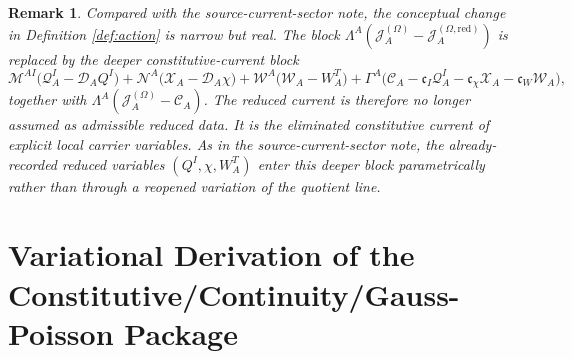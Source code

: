 \documentclass[11pt]{article}
\newcommand{\SpatialD}{\mathcal D}
\newcommand{\SourceCurrent}{\mathcal J^{(\Omega)}}
\newcommand{\SourceCurrentRed}{\mathcal J^{(\Omega,\mathrm{red})}}
\newcommand{\ConstCurrent}{\mathcal C}
\newcommand{\QCarrier}{\mathcal Q}
\newcommand{\ChiCarrier}{\mathcal X}
\newcommand{\TransCarrier}{\mathcal W}
\newcommand{\CurrentMult}{\Lambda}
\newcommand{\ConstGamma}{\Gamma}
\newcommand{\QMult}{\mathscr M}
\newcommand{\ChiMult}{\mathscr N}
\newcommand{\TransMult}{\mathscr W}
\newtheorem{remark}{Remark}
\begin{document}
\begin{remark}
Compared with the source-current-sector note, the conceptual change in Definition \ref{def:action} is narrow but real. The block \(\CurrentMult^A(\SourceCurrent_A-\SourceCurrentRed_A)\) is replaced by the deeper constitutive-current block
\[
\QMult^{AI}\bigl(\QCarrier^I_A-\SpatialD_AQ^I\bigr)
+\ChiMult^A\bigl(\ChiCarrier_A-\SpatialD_A\chi\bigr)
+\TransMult^A\bigl(\TransCarrier_A-W_A^T\bigr)
+\ConstGamma^A\bigl(\ConstCurrent_A-\mathfrak c_I\QCarrier^I_A-\mathfrak c_\chi\ChiCarrier_A-\mathfrak c_W\TransCarrier_A\bigr),
\]
together with \(\CurrentMult^A(\SourceCurrent_A-\ConstCurrent_A)\). The reduced current is therefore no longer assumed as admissible reduced data. It is the eliminated constitutive current of explicit local carrier variables. As in the source-current-sector note, the already-recorded reduced variables \((Q^I,\chi,W_A^T)\) enter this deeper block parametrically rather than through a reopened variation of the quotient line.
\end{remark}

\section{Variational Derivation of the Constitutive/Continuity/Gauss-Poisson Package}
\end{document}
